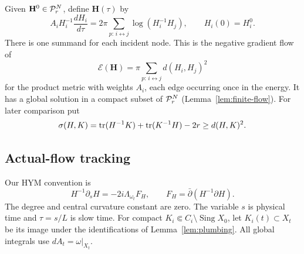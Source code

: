 Given $\mathbf H^0\in\mathcal P_r^N$, define $\mathbf H(\tau)$ by
\begin{equation}\label{eq:finite-flow}
 A_iH_i^{-1}\frac{dH_i}{d\tau}
 =2\pi\sum_{p:\,i\leftrightarrow j}\log(H_i^{-1}H_j),
 \qquad H_i(0)=H_i^0.
\end{equation}
There is one summand for each incident node. This is the negative
gradient flow of
\begin{equation}\label{eq:graph-energy}
 \mathscr E(\mathbf H)=\pi\sum_{p:\,i\leftrightarrow j}d(H_i,H_j)^2
\end{equation}
for the product metric with weights $A_i$, each edge occurring once in
the energy. It has a global solution in a compact subset of $\mathcal P_r^N$
(Lemma~\ref{lem:finite-flow}). For later comparison put
\begin{equation}\label{eq:sigma}
 \sigma(H,K)=\operatorname{tr}(H^{-1}K)+\operatorname{tr}(K^{-1}H)-2r\ge d(H,K)^2.
\end{equation}

\subsection{Actual-flow tracking}
Our HYM convention is
\begin{equation}\label{eq:hym-intro}
 H^{-1}\partial_sH=-2i\Lambda_{\omega_t}F_H,
 \qquad F_H=\bar\partial(H^{-1}\partial H).
\end{equation}
The degree and central curvature constant are zero. The variable $s$
is physical time and $\tau=s/L$ is slow time. For compact
$K_i\Subset C_i\setminus\operatorname{Sing}X_0$, let $K_i(t)\subset X_t$
be its image under the identifications of Lemma~\ref{lem:plumbing}.
All global integrals use $dA_t=\omega|_{X_t}$.

